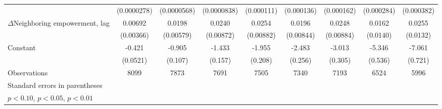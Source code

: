\begin{table}[htbp]
\begin{tabular}{l*{8}{c}}
                    & (0.0000278)         & (0.0000568)         & (0.0000838)         &  (0.000111)         &  (0.000136)         &  (0.000162)         &  (0.000284)         &  (0.000382)         \\
[1em]
$\Delta$Neighboring empowerment, lag&     0.00692\sym{*}  &      0.0198\sym{***}&      0.0240\sym{***}&      0.0254\sym{***}&      0.0196\sym{**} &      0.0248\sym{***}&      0.0162         &      0.0255\sym{*}  \\
                    &   (0.00366)         &   (0.00579)         &   (0.00872)         &   (0.00882)         &   (0.00844)         &   (0.00884)         &    (0.0140)         &    (0.0132)         \\
[1em]
Constant            &      -0.421\sym{***}&      -0.905\sym{***}&      -1.433\sym{***}&      -1.955\sym{***}&      -2.483\sym{***}&      -3.013\sym{***}&      -5.346\sym{***}&      -7.061\sym{***}\\
                    &    (0.0521)         &     (0.107)         &     (0.157)         &     (0.208)         &     (0.256)         &     (0.305)         &     (0.536)         &     (0.721)         \\
\hline
Observations        &        8099         &        7873         &        7691         &        7505         &        7340         &        7193         &        6524         &        5996         \\
\hline\hline
\multicolumn{9}{l}{\footnotesize Standard errors in parentheses}\\
\multicolumn{9}{l}{\footnotesize \sym{*} \(p<0.10\), \sym{**} \(p<0.05\), \sym{***} \(p<0.01\)}\\
\end{tabular}
\end{table}
